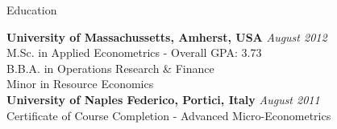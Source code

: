 \documentclass{resume} %
\begin{document}

	\begin{rSection}{Education}


	{\bf University of Massachussetts, Amherst, USA} \hfill {\em August 2012} \\
	M.Sc. in Applied Econometrics - Overall GPA: 3.73 \\
	B.B.A. in Operations Research \& Finance \\
	Minor in Resource Economics \\

	{\bf University of Naples Federico, Portici, Italy} \hfill {\em August 2011} \\
	Certificate of Course Completion - Advanced Micro-Econometrics \\

	\end{rSection}

\end{document}
